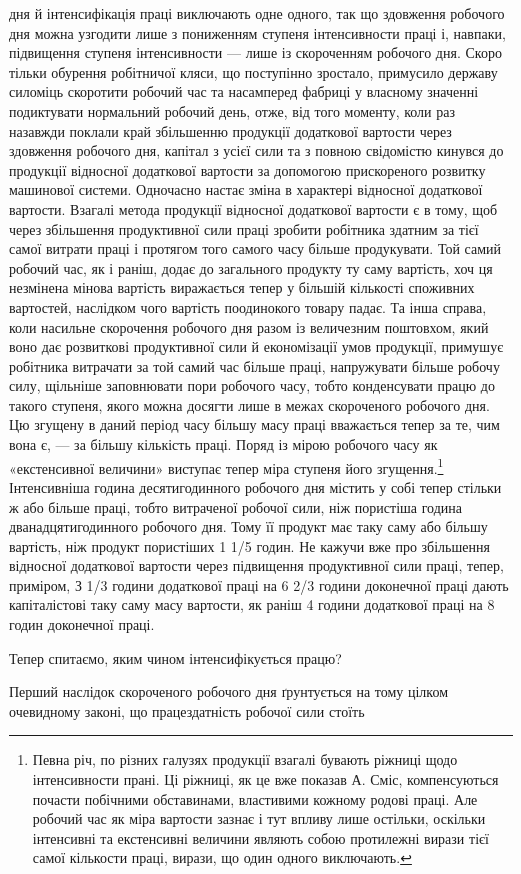 \parcont{}  %
дня й інтенсифікація праці виключають одне одного, так що
здовження робочого дня можна узгодити лише з пониженням
ступеня інтенсивности праці і, навпаки, підвищення ступеня інтенсивности
— лише із скороченням робочого дня. Скоро тільки
обурення робітничої кляси, що поступінно зростало, примусило
державу силоміць скоротити робочий час та насамперед фабриці
у власному значенні подиктувати нормальний робочий день,
отже, від того моменту, коли раз назавжди поклали край збільшенню
продукції додаткової вартости через здовження робочого
дня, капітал з усієї сили та з повною свідомістю кинувся до продукції
відносної додаткової вартости за допомогою прискореного
розвитку машинової системи. Одночасно настає зміна в характері
відносної додаткової вартости. Взагалі метода продукції відносної
додаткової вартости є в тому, щоб через збільшення продуктивної
сили праці зробити робітника здатним за тієї самої витрати праці
і протягом того самого часу більше продукувати. Той самий
робочий час, як і раніш, додає до загального продукту ту саму
вартість, хоч ця незмінена мінова вартість виражається тепер у
більшій кількості споживних вартостей, наслідком чого вартість
поодинокого товару падає. Та інша справа, коли насильне скорочення
робочого дня разом із величезним поштовхом, який воно
дає розвиткові продуктивної сили й економізації умов продукції,
примушує робітника витрачати за той самий час більше праці,
напружувати більше робочу силу, щільніше заповнювати пори
робочого часу, тобто конденсувати працю до такого ступеня, якого
можна досягти лише в межах скороченого робочого дня. Цю
згущену в даний період часу більшу масу праці вважається тепер
за те, чим вона є, — за більшу кількість праці. Поряд із мірою
робочого часу як «екстенсивної величини» виступає тепер міра
ступеня його згущення.\footnote{
Певна річ, по різних галузях продукції взагалі бувають ріжниці
щодо інтенсивности прані. Ці ріжниці, як це вже показав А. Сміс, компенсуються
почасти побічними обставинами, властивими кожному родові
праці. Але робочий час як міра вартости зазнає і тут впливу лише остільки,
оскільки інтенсивні та екстенсивні величини являють собою протилежні
вирази тієї самої кількости праці, вирази, що один одного виключають.
} Інтенсивніша година десятигодинного
робочого дня містить у собі тепер стільки ж або більше праці,
тобто витраченої робочої сили, ніж пористіша година дванадцятигодинного
робочого дня. Тому її продукт має таку саму або більшу
вартість, ніж продукт пористіших 1 1/5 годин. Не кажучи вже про
збільшення відносної додаткової вартости через підвищення продуктивної
сили праці, тепер, приміром, З 1/3 години додаткової
праці на 6 2/3 години доконечної праці дають капіталістові таку
саму масу вартости, як раніш 4 години додаткової праці на 8 годин
доконечної праці.

Тепер спитаємо, яким чином інтенсифікується працю?

Перший наслідок скороченого робочого дня ґрунтується на тому
цілком очевидному законі, що працездатність робочої сили стоїть
\parbreak{}  %
